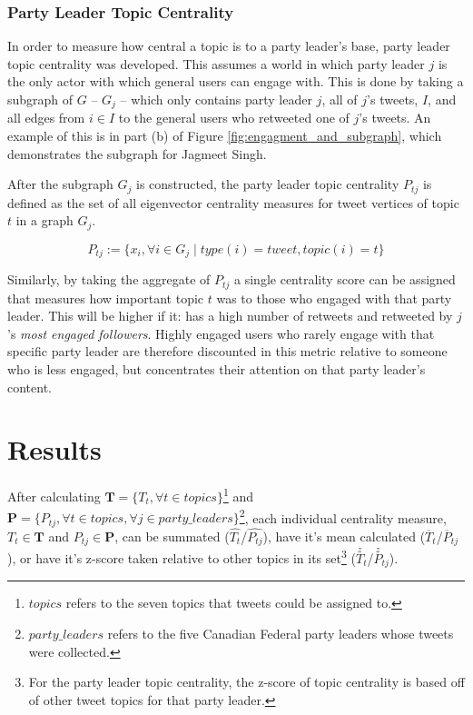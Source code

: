 \subsubsection{Party Leader Topic Centrality}

In order to measure how central a topic is to a party leader's base, party
leader topic centrality was developed. This assumes a world in which party
leader $j$ is the only actor with which general users can engage with. This is
done by taking a subgraph of $G$ -- $G_{j}$ -- which only contains party leader
$j$, all of $j$'s tweets, $I$, and all edges from $i\in I$ to the general users
who retweeted one of $j$'s tweets. An example of this is in part (b) of Figure
\ref{fig:engagment_and_subgraph}, which demonstrates the subgraph for Jagmeet
Singh. 

After the subgraph $G_j$ is constructed, the party leader topic
centrality $P_{tj}$ is defined as the set of all eigenvector centrality measures
for tweet vertices of topic $t$ in a graph $G_{j}$.

\begin{equation}
    P_{tj} := \{ x_i ,  \forall i \in G_{j} \mid type(i)=tweet, topic(i)=t \}
\end{equation}

Similarly, by taking the aggregate of $P_{tj}$ a single centrality score can be
assigned that measures how important topic $t$ was to those who engaged with
that party leader. This will be higher if it: has a high number of retweets
and  retweeted by $j$'s \emph{most engaged followers}. Highly engaged users who
rarely engage with that specific party leader are therefore discounted in this
metric relative to someone who is less engaged, but concentrates their attention
on that party leader's content. 

\section{Results}

After calculating $\textbf{T}=\{T_{t}, \forall t \in topics\}$\footnote{$topics$
refers to the seven topics that tweets could be assigned to.} and
$\textbf{P}=\{P_{tj}, \forall t \in topics,\forall j \in
party\_leaders\}$\footnote{$party\_leaders$ refers to the five Canadian Federal
party leaders whose tweets were collected.}, each individual centrality measure,
$T_{t} \in \textbf{T}$ and $P_{tj}\in \textbf{P}$, can be summated
($\hat{T_{t}}$/$\hat{P_{tj}}$), have it's mean calculated
($\overline{T}_{t}$/$\overline{P}_{tj}$), or have it's z-score taken relative to
other topics in its set\footnote{For the party leader topic centrality, the
z-score of topic centrality is based off of other tweet topics for that party
leader.} ($\stackrel{z}{T}_{t}$/$\stackrel{z}{P}_{tj}$).

